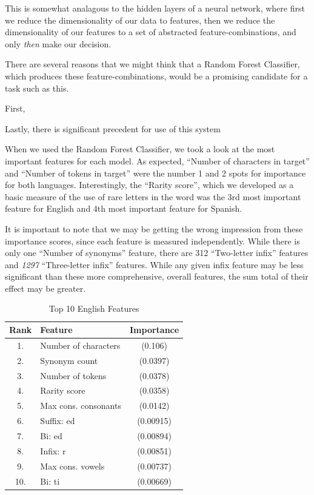 \documentclass[11pt,a4paper]{article}
\begin{document}
This is somewhat analagous to the hidden layers of a neural network, where first we reduce the dimensionality of our data to features, then we reduce the dimensionality of our features to a set of abstracted feature-combinations, and only \emph{then} make our decision.

 There are several reasons that we might think that a Random Forest Classifier, which produces these feature-combinations, would be a promising candidate for a task such as this. 

First, \cite{treeratpituk2009disambiguating}

Lastly, there is significant precedent for use of this system

When we used the Random Forest Classifier, we took a look at the most important features for each model. As expected, \enquote{Number of characters in target} and \enquote{Number of tokens in target} were the number 1 and 2 spots for importance for both languages. Interestingly, the \enquote{Rarity score}, which we developed as a basic measure of the use of rare letters in the word was the 3rd most important feature for English and 4th most important feature for Spanish. 

It is important to note that we may be getting the wrong impression from these importance scores, since each feature is measured independently. While there is only one \enquote{Number of synonyms} feature, there are 312 \enquote{Two-letter infix} features and \textit{1297} \enquote{Three-letter infix} features. While any given infix feature may be less significant than these more comprehensive, overall features, the sum total of their effect may be greater.

\begin{table}[h]
\begin{center}
\begin{tabular}{|c|l|c|}
\hline
\textbf{Rank} & \textbf{Feature} & \textbf{Importance} \\
\hline
1. & Number of characters & (0.106) \\ \hline
2. & Synonym count & (0.0397) \\ \hline
3. & Number of tokens & (0.0378) \\ \hline
4. & Rarity score & (0.0358) \\ \hline
5. & Max cons. consonants & (0.0142) \\ \hline
6. & Suffix: ed & (0.00915) \\ \hline
7. & Bi: ed & (0.00894) \\ \hline
8. & Infix: r & (0.00851) \\ \hline
9. & Max cons. vowels & (0.00737) \\ \hline
10. & Bi: ti & (0.00669) \\ \hline
\end{tabular}
\caption{Top 10 English Features}
\label{tab:EngFeats}
\end{center}
\end{table}
\end{document}
